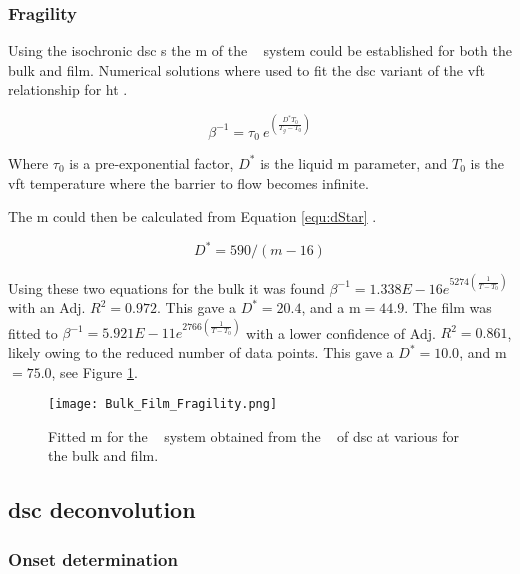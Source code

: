 \documentclass[draft,a4paper,12pt,oneside]{article}%
\begin{document}
\subsubsection{Fragility}

Using the isochronic \acrshort{dsc} \Tg s the \gls{m} of the \MgZnCa~ system could be established for both the bulk and film. Numerical solutions where used to fit the \acrshort{dsc} variant of the \gls{vft} relationship for \gls{ht} \cite{Busch1998}.

\begin{equation}
	\beta^{-1} = \tau_{0}~ e^{(\frac{D^{*}T_{0}}{T_{g}-T_{0}})}
	\label{equ:VFT}
\end{equation}

Where $\tau_{0}$ is a pre-exponential factor, $D^{*}$ is the liquid \acrlong{m} parameter, and $T_{0}$ is the \gls{vft} temperature where the barrier to flow becomes infinite.

The \gls{m} could then be calculated from Equation \ref{equ:dStar} \cite{Angell2002, Wei2014}.

\begin{equation}
	D^{*}=590/(m-16)
	\label{equ:dStar}
\end{equation}

Using these two equations for the bulk it was found $\beta^{-1} = 1.338E - 16e^{5274 (\frac{1}{T-T_{0}})}$ with an Adj. $R^{2}=0.972$. This gave a $D^{*}=20.4$, and a \gls{m}$=44.9$. The film was fitted to $\beta^{-1} = 5.921E - 11e^{2766 (\frac{1}{T-T_{0}})}$ with a lower confidence of Adj. $R^{2}=0.861$, likely owing to the reduced number of data points. This gave a $D^{*}=10.0$, and \gls{m}$=75.0$, see Figure \ref{fig:Fragility_BulkFilm_mValue}.

\begin{figure}[b]
	\centering
	\texttt{[image: Bulk\_Film\_Fragility.png]}
	\caption{Fitted \acrfull{m} for the \MgZnCa~ system obtained from the \Tg~ of \acrshort{dsc} at various  for the bulk and film.}
	\label{fig:Fragility_BulkFilm_mValue}
\end{figure}

\subsection{\acrshort{dsc} deconvolution}

\subsubsection{Onset determination}
\end{document}
